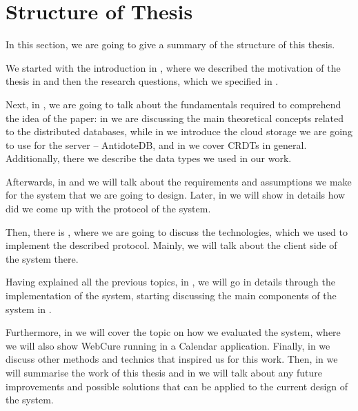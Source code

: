 \section{Structure of Thesis}

In this section, we are going to give a summary of the structure of this thesis. 

We started with the introduction in , where we described the motivation of the thesis in  and then the research questions, which we specified in . 

Next, in , we are going to talk about the fundamentals required to comprehend the idea of the paper: in  we are discussing the main theoretical concepts related to the distributed databases, while in  we introduce the cloud storage we are going to use for the server -- AntidoteDB, and in  we cover CRDTs in general. Additionally, there we describe the data types we used in our work. 

Afterwards, in  and  we will talk about the requirements and assumptions we make for the system that we are going to design. Later, in  we will show in details how did we come up with the protocol of the system. 

Then, there is , where we are going to discuss the technologies, which we used to implement the described protocol. Mainly, we will talk about the client side of the system there.

Having explained all the previous topics, in , we will go in details through the implementation of the system, starting discussing the main components of the system in .

Furthermore, in  we will cover the topic on how we evaluated the system, where we will also show WebCure running in a Calendar application. Finally, in  we discuss other methods and technics that inspired us for this work. Then, in  we will summarise the work of this thesis and in  we will talk about any future improvements and possible solutions that can be applied to the current design of the system. 